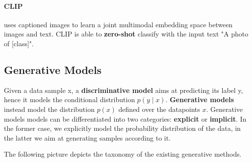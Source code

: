 \documentclass{article}
\begin{document}
\paragraph{CLIP} uses captioned images to learn a joint multimodal embedding space between images and text.
CLIP is able to \textbf{zero-shot} classify with the input text "A photo of [class]".

\subsection{Generative Models}

Given a data sample x, a \textbf{discriminative model} aims at predicting its label y, hence it models the conditional distribution $p(y \mid x)$.
\textbf{Generative models} instead model the distribution $p(x)$ defined over the datapoints $x$.
Generative models models can be differentiated into two categories: \textbf{explicit} or \textbf{implicit}.
In the former case, we explicitly model the probability distribution of the data, in the latter we aim at generating samples according to it.

The following picture depicts the taxonomy of the existing generative methods.
\end{document}
